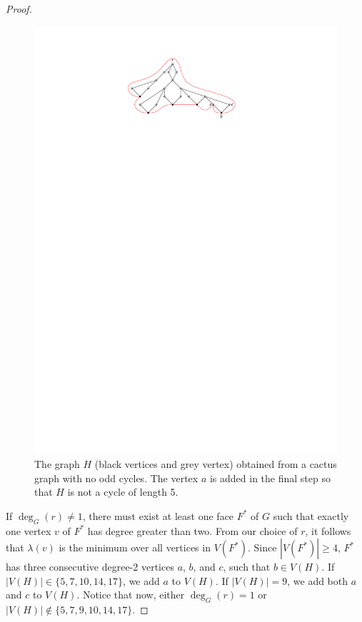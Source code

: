 \documentclass{patmorin}
\begin{document}
\begin{proof}
 \begin{figure}
    \begin{center}
        \includegraphics{figs/cactus}
    \end{center}
    \caption{The graph $H$ (black vertices and grey vertex) obtained
        from a cactus graph with no odd cycles.  The vertex $a$ is added
        in the final step so that $H$ is not a cycle of length 5.}
 \end{figure}

If $\deg_G(r)\ne 1$, there must exist at least one face $F^*$ of $G$ such
that exactly one vertex $v$ of $F^*$ has degree greater than two. From
our choice of $r$, it follows that $\lambda(v)$ is the minimum over all
vertices in $V(F^*)$.  Since $|V(F^*)|\ge 4$, $F^*$ has three consecutive
degree-2 vertices $a$, $b$, and $c$, such that $b\in V(H)$. If $|V(H)|\in
\{5,7,10,14,17\}$, we add $a$ to $V(H)$. If $|V(H)|=9$, we add both $a$
and $c$ to $V(H)$. Notice that now, either $\deg_G(r)=1$ or $|V(H)|\notin
\{5,7,9,10,14,17\}$.


\end{proof}
\end{document}
